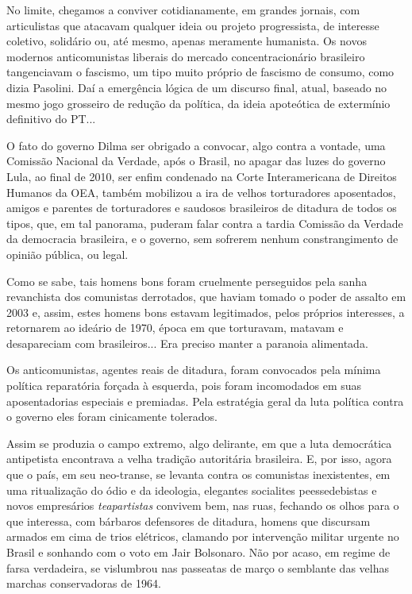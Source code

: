 No limite, chegamos a conviver cotidianamente, em grandes jornais, com
articulistas que atacavam qualquer ideia ou projeto progressista, de
interesse coletivo, solidário ou, até mesmo, apenas meramente humanista.
Os novos modernos anticomunistas liberais do mercado concentracionário
brasileiro tangenciavam o fascismo, um tipo muito próprio de fascismo de
consumo, como dizia Pasolini. Daí a emergência lógica de um discurso
final, atual, baseado no mesmo jogo grosseiro de redução da política, da
ideia apoteótica de extermínio definitivo do PT...

O fato do governo Dilma ser obrigado a convocar, algo contra a vontade,
uma Comissão Nacional da Verdade, após o Brasil, no apagar das luzes do
governo Lula, ao final de 2010, ser enfim condenado na Corte
Interamericana de Direitos Humanos da OEA, também mobilizou a ira de
velhos torturadores aposentados, amigos e parentes de torturadores e
saudosos brasileiros de ditadura de todos os tipos, que, em tal
panorama, puderam falar contra a tardia Comissão da Verdade da
democracia brasileira, e o governo, sem sofrerem nenhum constrangimento
de opinião pública, ou legal.

Como se sabe, tais homens bons foram cruelmente perseguidos pela sanha
revanchista dos comunistas derrotados, que haviam tomado o poder de
assalto em 2003 e, assim, estes homens bons estavam legitimados, pelos
próprios interesses, a retornarem ao ideário de 1970, época em que
torturavam, matavam e desapareciam com brasileiros... Era preciso manter
a paranoia alimentada.

Os anticomunistas, agentes reais de ditadura, foram convocados pela
mínima política reparatória forçada à esquerda, pois foram incomodados
em suas aposentadorias especiais e premiadas. Pela estratégia geral da
luta política contra o governo eles foram cinicamente tolerados.

Assim se produzia o campo extremo, algo delirante, em que a luta
democrática antipetista encontrava a velha tradição autoritária
brasileira. E, por isso, agora que o país, em seu neo-transe, se levanta
contra os comunistas inexistentes, em uma ritualização do ódio e da
ideologia, elegantes socialites peessedebistas e novos empresários
\emph{teapartistas} convivem bem, nas ruas, fechando os olhos para o que
interessa, com bárbaros defensores de ditadura, homens que discursam
armados em cima de trios elétricos, clamando por intervenção militar
urgente no Brasil e sonhando com o voto em Jair Bolsonaro. Não por
acaso, em regime de farsa verdadeira, se vislumbrou nas passeatas de
março o semblante das velhas marchas conservadoras de 1964.

